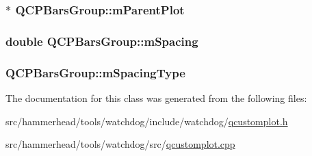 \subsubsection[{\texorpdfstring{m\+Parent\+Plot}{mParentPlot}}]{$\ast$ Q\+C\+P\+Bars\+Group\+::m\+Parent\+Plot\hspace{0.3cm}{\ttfamily [protected]}}\hypertarget{classQCPBarsGroup_a973d408cfbf88db95115aec71877f9e7}{}\label{classQCPBarsGroup_a973d408cfbf88db95115aec71877f9e7}
\subsubsection[{\texorpdfstring{m\+Spacing}{mSpacing}}]{\setlength{\rightskip}{0pt plus 5cm}double Q\+C\+P\+Bars\+Group\+::m\+Spacing\hspace{0.3cm}{\ttfamily [protected]}}\hypertarget{classQCPBarsGroup_a56471d7f548ca6141b7a5bf9629f7ece}{}\label{classQCPBarsGroup_a56471d7f548ca6141b7a5bf9629f7ece}
\subsubsection[{\texorpdfstring{m\+Spacing\+Type}{mSpacingType}}]{ Q\+C\+P\+Bars\+Group\+::m\+Spacing\+Type\hspace{0.3cm}{\ttfamily [protected]}}\hypertarget{classQCPBarsGroup_a6794ee1a9c81864d627bff6a4b2d64ec}{}\label{classQCPBarsGroup_a6794ee1a9c81864d627bff6a4b2d64ec}


The documentation for this class was generated from the following files\+:\begin{DoxyCompactItemize}
\item 
src/hammerhead/tools/watchdog/include/watchdog/\hyperlink{qcustomplot_8h}{qcustomplot.\+h}\item 
src/hammerhead/tools/watchdog/src/\hyperlink{qcustomplot_8cpp}{qcustomplot.\+cpp}\end{DoxyCompactItemize}
